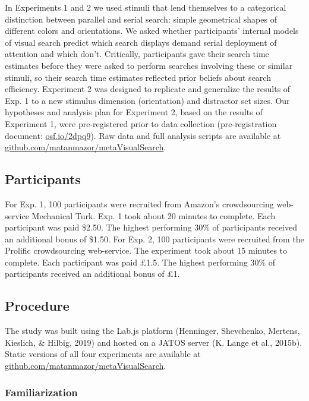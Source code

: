\documentclass[12pt,twoside]{reedthesis}
\begin{document}
In Experiments 1 and 2 we used stimuli that lend themselves to a categorical distinction between parallel and serial search: simple geometrical shapes of different colors and orientations. We asked whether participants' internal models of visual search predict which search displays demand serial deployment of attention and which don't. Critically, participants gave their search time estimates before they were asked to perform searches involving these or similar stimuli, so their search time estimates reflected prior beliefs about search efficiency. Experiment 2 was designed to replicate and generalize the results of Exp. 1 to a new stimulus dimension (orientation) and distractor set sizes. Our hypotheses and analysis plan for Experiment 2, based on the results of Experiment 1, were pre-registered prior to data collection (pre-registration document: \url{osf.io/2dpq9}). Raw data and full analysis scripts are available at \url{github.com/matanmazor/metaVisualSearch}.

\hypertarget{participants-2}{%
\subsection{Participants}\label{participants-2}}

For Exp. 1, 100 participants were recruited from Amazon's crowdsourcing web-service Mechanical Turk. Exp. 1 took about 20 minutes to complete. Each participant was paid \$2.50. The highest performing 30\% of participants received an additional bonus of \$1.50. For Exp. 2, 100 participants were recruited from the Prolific crowdsourcing web-service. The experiment took about 15 minutes to complete. Each participant was paid £1.5. The highest performing 30\% of participants received an additional bonus of £1.

\hypertarget{procedure-2}{%
\subsection{Procedure}\label{procedure-2}}

The study was built using the Lab.js platform (Henninger, Shevchenko, Mertens, Kieslich, \& Hilbig, 2019) and hosted on a JATOS server (K. Lange et al., 2015b). Static versions of all four experiments are available at \url{github.com/matanmazor/metaVisualSearch}.

\hypertarget{familiarization}{%
\subsubsection*{Familiarization}\label{familiarization}}
\end{document}
